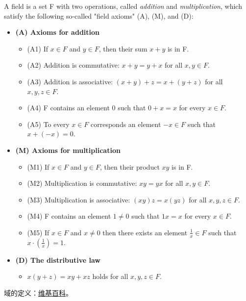 \documentclass[../poma-note.tex]{subfiles}
\begin{document}
\setcounter{definition}{11}
\begin{definition}
	A field is a set F with two operations, called \textit{addition} and \textit{multiplication},
	which satisfy the following so-called "field axioms" (A), (M), and (D):

	\begin{itemize}
		\item[] \textbf{(A) Axioms for addition}
			\begin{itemize}
				\item[] (A1) If $x \in F$ and $y \in F$, then their sum $x + y$ is in F.
				\item[] (A2) Addition is commutative: $x + y = y + x$ for all $x,y \in F$.
				\item[] (A3) Addition is associative: $(x+y)+z=x+(y+z)$ for all $x,y,z \in F$.
				\item[] (A4) F contains an element 0 such that $0+x=x$ for every $x \in F$.
				\item[] (A5) To every $x \in F$ corresponds an element $-x \in F$ such that $x+(-x)=0$.
			\end{itemize}
		\item[] \textbf{(M) Axioms for multiplication}
			\begin{itemize}
				\item[] (M1) If $x \in F$ and $y \in F$, then their product $xy$ is in F.
				\item[] (M2) Multiplication is commutative: $xy = yx$ for all $x,y \in F$.
				\item[] (M3) Multiplication is associative: $(xy)z = x(yz)$ for all $x,y,z \in F$.
				\item[] (M4) F contains an element $1 \ne 0$ such that $1x = x$ for every $x \in F$.
				\item[] (M5) If $x \in F$ and $x \ne 0$ then there exists an element $\frac{1}{x} \in F$
					such that $x \cdot (\frac{1}{x}) = 1$.
			\end{itemize}
		\item[] \textbf{(D) The distributive law}
			\begin{itemize}
				\item[] $x(y+z) = xy+xz$ holds for all $x,y,z \in F$.
			\end{itemize}

	\end{itemize}
\end{definition}

\anote{}
域的定义：\href{https://en.wikipedia.org/wiki/Field_(mathematics)}{维基百科}。
\end{document}
